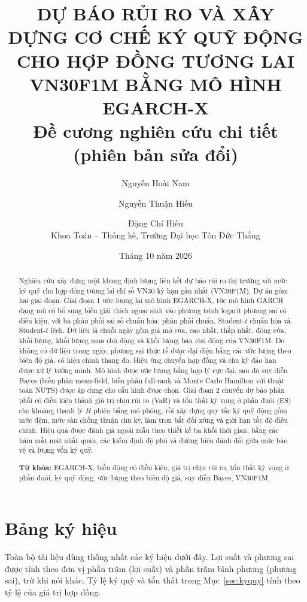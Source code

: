 \documentclass[12pt,a4paper]{article}
\title{\textbf{DỰ BÁO RỦI RO VÀ XÂY DỰNG CƠ CHẾ KÝ QUỸ ĐỘNG CHO HỢP ĐỒNG TƯƠNG LAI VN30F1M BẰNG MÔ HÌNH EGARCH-X}\\[6pt]
\large Đề cương nghiên cứu chi tiết (phiên bản sửa đổi)}
\author{Nguyễn Hoài Nam \and Nguyễn Thuận Hiếu \and Đặng Chí Hiếu\\[4pt]
\small Khoa Toán -- Thống kê, Trường Đại học Tôn Đức Thắng}
\date{Tháng 10 năm 2026}
\theoremstyle{definition}
\theoremstyle{remark}
\begin{document}
\maketitle
\thispagestyle{empty}

\begin{abstract}
\noindent Nghiên cứu xây dựng một khung định lượng liên kết dự báo rủi ro thị trường với mức ký quỹ cho hợp đồng tương lai chỉ số VN30 kỳ hạn gần nhất (VN30F1M). Dự án gồm hai giai đoạn. Giai đoạn 1 ước lượng lại mô hình EGARCH-X, tức mô hình GARCH dạng mũ có bổ sung biến giải thích ngoại sinh vào phương trình logarit phương sai có điều kiện, với ba phân phối sai số chuẩn hóa: phân phối chuẩn, Student-$t$ chuẩn hóa và Student-$t$ lệch. Dữ liệu là chuỗi ngày gồm giá mở cửa, cao nhất, thấp nhất, đóng cửa, khối lượng, khối lượng mua chủ động và khối lượng bán chủ động của VN30F1M. Do không có dữ liệu trong ngày, phương sai thực tế được đại diện bằng các ước lượng theo biên độ giá, có hiệu chỉnh thang đo. Hiệu ứng chuyển hợp đồng và chu kỳ đáo hạn được xử lý tường minh. Mô hình được ước lượng bằng hợp lý cực đại, sau đó suy diễn Bayes (biến phân mean-field, biến phân full-rank và Monte Carlo Hamilton với thuật toán NUTS) được áp dụng cho cấu hình được chọn. Giai đoạn 2 chuyển dự báo phân phối có điều kiện thành giá trị chịu rủi ro (VaR) và tổn thất kỳ vọng ở phần đuôi (ES) cho khoảng thanh lý $H$ phiên bằng mô phỏng, rồi xây dựng quy tắc ký quỹ động gồm mức đệm, mức sàn chống thuận chu kỳ, làm trơn bất đối xứng và giới hạn tốc độ điều chỉnh. Hiệu quả được đánh giá ngoài mẫu theo thiết kế ba khối thời gian, bằng các hàm mất mát nhất quán, các kiểm định độ phủ và đường biên đánh đổi giữa mức bảo vệ và lượng vốn ký quỹ.

\medskip
\noindent\textbf{Từ khóa:} EGARCH-X, biến động có điều kiện, giá trị chịu rủi ro, tổn thất kỳ vọng ở phần đuôi, ký quỹ động, ước lượng theo biên độ giá, suy diễn Bayes, VN30F1M.
\end{abstract}

\newpage
\tableofcontents
\newpage

\section*{Bảng ký hiệu}

Toàn bộ tài liệu dùng thống nhất các ký hiệu dưới đây. Lợi suất và phương sai được tính theo đơn vị phần trăm (lợi suất) và phần trăm bình phương (phương sai), trừ khi nói khác. Tỷ lệ ký quỹ và tổn thất trong Mục~\ref{sec:kyquy} tính theo tỷ lệ của giá trị hợp đồng.
\end{document}

